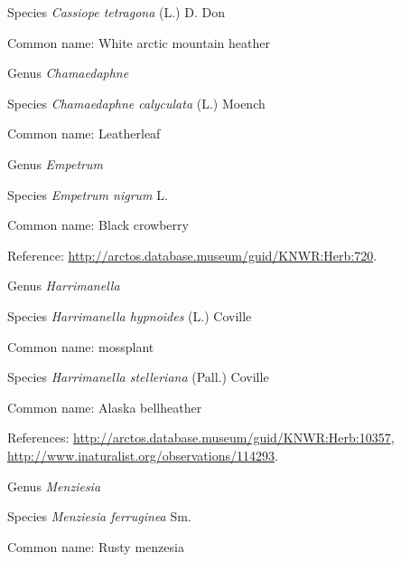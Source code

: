\documentclass[9pt, article]{memoir}
\begin{document}
\begin{multicols}{2}
\vspace{6pt}\noindent\hspace{36pt}Species \textit{Cassiope tetragona} (L.) D. Don


Common name: White arctic mountain heather

\vspace{6pt}\noindent\hspace{30pt}Genus \textit{Chamaedaphne}


\vspace{6pt}\noindent\hspace{36pt}Species \textit{Chamaedaphne calyculata} (L.) Moench


Common name: Leatherleaf

\vspace{6pt}\noindent\hspace{30pt}Genus \textit{Empetrum}


\vspace{6pt}\noindent\hspace{36pt}Species \textit{Empetrum nigrum} L.


Common name: Black crowberry

Reference: 
\url{http://arctos.database.museum/guid/KNWR:Herb:720}.

\vspace{6pt}\noindent\hspace{30pt}Genus \textit{Harrimanella}


\vspace{6pt}\noindent\hspace{36pt}Species \textit{Harrimanella hypnoides} (L.) Coville


Common name: mossplant

\vspace{6pt}\noindent\hspace{36pt}Species \textit{Harrimanella stelleriana} (Pall.) Coville


Common name: Alaska bellheather

References: 
\url{http://arctos.database.museum/guid/KNWR:Herb:10357}, 
\url{http://www.inaturalist.org/observations/114293}.

\vspace{6pt}\noindent\hspace{30pt}Genus \textit{Menziesia}


\vspace{6pt}\noindent\hspace{36pt}Species \textit{Menziesia ferruginea} Sm.


Common name: Rusty menzesia


\end{multicols}
\end{document}
